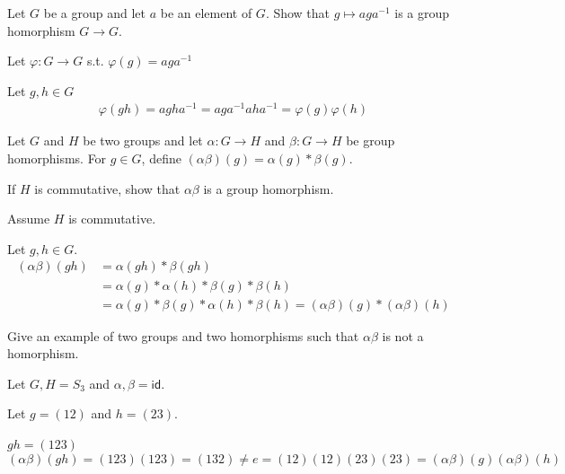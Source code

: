 \documentclass[12pt, letterpaper]{article}
\begin{document}
\color{\TextColor}
\pagecolor{\colormode}
\setlength{\parindent}{0pt}
\pagestyle{fancy}
\fancyhf{}
\fancyhead[ROE]{\color{\TextColor}\jobname --- \thepage}

\begin{problem}{}
    Let $G$ be a group and let $a$ be an element of $G$. Show that $g \mapsto aga^{-1}$ is a group homorphism $G \to G$.
\end{problem}
\begin{problemproof}
    Let $\varphi : G \to G$ s.t. $\varphi(g)=aga^{-1}$

    Let $g,h \in G$
    \begin{align*}
        \varphi(gh)=agha^{-1}=aga^{-1}aha^{-1}=\varphi(g)\varphi(h)
    \end{align*}
\end{problemproof}

\begin{problem}{}
    Let $G$ and $H$ be two groups and let $\alpha: G \to H$ and $\beta: G \to H$ be group homorphisms. For $g \in G$, define $(\alpha\beta)(g)=\alpha(g)*\beta(g)$.
\end{problem}

\begin{subproblem}{}
    If $H$ is commutative, show that $\alpha\beta$ is a group homorphism.
\end{subproblem}
\begin{problemproof}
    Assume $H$ is commutative.

    Let $g,h \in G$.
    \begin{align*}
        (\alpha\beta)(gh) &= \alpha(gh) * \beta(gh)\\ 
                          &= \alpha(g) * \alpha(h) * \beta(g) * \beta(h)\\
                          &= \alpha(g) * \beta(g) * \alpha(h) * \beta(h) = (\alpha\beta)(g) * (\alpha\beta)(h)
    \end{align*}
\end{problemproof}
\begin{subproblem}{}
    Give an example of two groups and two homorphisms such that $\alpha\beta$ is not a homorphism.
\end{subproblem}
\begin{problemproof}
    Let $G,H = S_3$ and $\alpha,\beta = \mathsf{id}$.

    Let $g=(12)$ and $h=(23)$. 
    
    $gh=(123)$
    \[(\alpha\beta)(gh)=(123)(123)=(132) \neq e = (12)(12)(23)(23) = (\alpha\beta)(g)(\alpha\beta)(h)\]
\end{problemproof}
\end{document}
